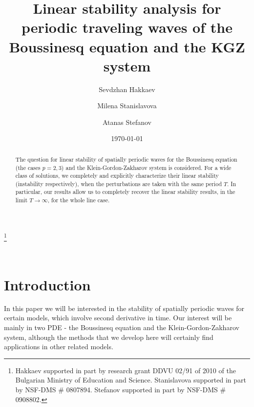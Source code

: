 \documentclass[final,11pt,leqno]{amsart}
\begin{document}
\title
[Linear stability for periodic waves of Boussinesq  and KGZ]
{Linear stability analysis for periodic traveling waves of the  Boussinesq equation and the KGZ system }

\author{Sevdzhan Hakkaev}
\author{Milena Stanislavova}
\author{Atanas Stefanov}

\address{Sevdzhan Hakkaev 
Faculty of Mathematics and Informatics, Shumen University, 9712
Shumen, Bulgaria} 
\address{Milena Stanislavova
Department of Mathematics, University of Kansas, 1460 Jayhawk
Boulevard,  Lawrence KS 66045--7523} 
\address{Atanas Stefanov
Department of Mathematics, University of Kansas, 1460 Jayhawk
Boulevard,  Lawrence KS 66045--7523}


\thanks{Hakkaev supported in part by research grant  DDVU 02/91 of 2010 of the
Bulgarian Ministry of Education and Science.
Stanislavova  supported in part by NSF-DMS \# 0807894.
Stefanov supported in part by NSF-DMS \# 0908802.}

\date{\today}



\begin{abstract}
The question for linear stability of spatially periodic waves for the Boussinesq equation (the cases $p=2,3$) and the Klein-Gordon-Zakharov system is considered. For a wide class of solutions, we completely and explicitly characterize their linear stability (instability respectively), when the perturbations are taken with the same period $T$. In particular, our results allow us to completely recover the   linear stability results, in the limit $T\to \infty$,  for the whole line case.
\end{abstract}
\
\maketitle

\section{Introduction}
In this paper we will be interested in the stability of spatially periodic waves for certain models, which involve second derivative in time. Our interest
will be mainly in two PDE - the Boussinesq equation and the Klein-Gordon-Zakharov system, although the methods that we develop here will certainly
find applications in other
 related models.
\end{document}
